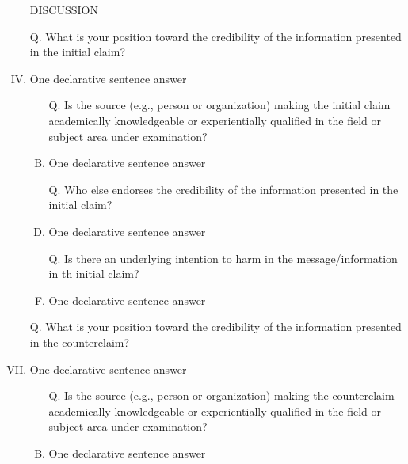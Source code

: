 \documentclass[a4paper, 12pt]{article}
\begin{document}
\begin{CJK*}{UTF8}{bsmi}
\begin{enumerate}[I.]
            \item [] %
            \item [] DISCUSSION
            \item [Q.] What is your position toward the credibility of the information presented in the {\color{blue}initial claim}?
            \item {\color{gray} One declarative sentence answer} %
                  \begin{enumerate}[A.]
                        \item [Q.] Is the source (e.g., person or organization) making the {\color{blue}initial claim} academically knowledgeable
                              or experientially qualified in the field or subject area under examination?
                        \item {\color{gray} One declarative sentence answer} %
                        \item [Q.] Who else endorses the credibility of the information presented in the {\color{blue}initial claim}?
                        \item {\color{gray} One declarative sentence answer}
                        \item [Q.] Is there an underlying intention to harm in the message/information in th {\color{blue}initial claim}?
                        \item {\color{gray} One declarative sentence answer}
                  \end{enumerate}
            \item []
            \item [Q.] What is your position toward the credibility of the information presented in the {\color{red} counterclaim}?
            \item {\color{gray} One declarative sentence answer} %
                  \begin{enumerate}[A.]
                        \item [Q.] Is the source (e.g., person or organization) making the {\color{red}counterclaim} academically knowledgeable
                              or experientially qualified in the field or subject area under examination?
                        \item {\color{gray} One declarative sentence answer} %

\end{enumerate}
\end{enumerate}
\end{CJK*}
\end{document}
